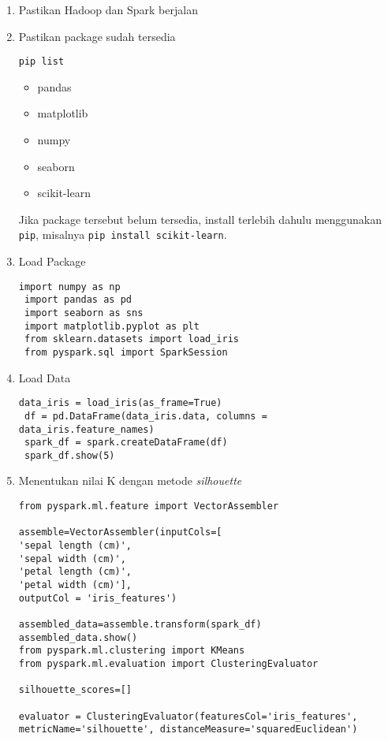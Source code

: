 \documentclass[a4paper]{tufte-handout}
\begin{document}
\begin{enumerate}
\item Pastikan Hadoop dan Spark berjalan
\item Pastikan package sudah tersedia
\begin{lstlisting}[language=Terminal]
 pip list
\end{lstlisting} 
\begin{multicols}{3}
\begin{itemize}
\item pandas
\item matplotlib
\item numpy
\item seaborn
\item scikit-learn
\end{itemize}
\end{multicols}

Jika package tersebut belum tersedia, install terlebih dahulu menggunakan {\tt pip}, misalnya {\tt pip install scikit-learn}.

\item Load Package
\begin{lstlisting}[language=Terminal]
 import numpy as np
 import pandas as pd
 import seaborn as sns
 import matplotlib.pyplot as plt
 from sklearn.datasets import load_iris
 from pyspark.sql import SparkSession
\end{lstlisting}

\item Load Data
\begin{lstlisting}[language=Terminal]
 data_iris = load_iris(as_frame=True)
 df = pd.DataFrame(data_iris.data, columns = data_iris.feature_names)
 spark_df = spark.createDataFrame(df)
 spark_df.show(5)
\end{lstlisting}

\item Menentukan nilai K dengan metode \textit{silhouette}
\begin{lstlisting}[language=Terminal]
from pyspark.ml.feature import VectorAssembler

assemble=VectorAssembler(inputCols=[
'sepal length (cm)',
'sepal width (cm)',
'petal length (cm)',
'petal width (cm)'],
outputCol = 'iris_features')

assembled_data=assemble.transform(spark_df)
assembled_data.show()
from pyspark.ml.clustering import KMeans
from pyspark.ml.evaluation import ClusteringEvaluator

silhouette_scores=[]

evaluator = ClusteringEvaluator(featuresCol='iris_features', 
metricName='silhouette', distanceMeasure='squaredEuclidean')


\end{lstlisting}
\end{enumerate}
\end{document}

